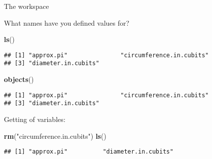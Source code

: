 \documentclass[8pt,ignorenonframetext,]{beamer}
\newenvironment{Shaded}{\begin{snugshade}}{\end{snugshade}}
\newcommand{\KeywordTok}[1]{\textcolor[rgb]{0.13,0.29,0.53}{\textbf{#1}}}
\newcommand{\StringTok}[1]{\textcolor[rgb]{0.31,0.60,0.02}{#1}}
\newcommand{\NormalTok}[1]{#1}
\begin{document}
\begin{frame}[fragile]{The workspace}

What names have you defined values for?

\begin{Shaded}
\begin{Highlighting}[]
\KeywordTok{ls}\NormalTok{()}
\end{Highlighting}
\end{Shaded}

\begin{verbatim}
## [1] "approx.pi"               "circumference.in.cubits"
## [3] "diameter.in.cubits"
\end{verbatim}

\begin{Shaded}
\begin{Highlighting}[]
\KeywordTok{objects}\NormalTok{()}
\end{Highlighting}
\end{Shaded}

\begin{verbatim}
## [1] "approx.pi"               "circumference.in.cubits"
## [3] "diameter.in.cubits"
\end{verbatim}

Getting of variables:

\begin{Shaded}
\begin{Highlighting}[]
\KeywordTok{rm}\NormalTok{(}\StringTok{"circumference.in.cubits"}\NormalTok{)}
\KeywordTok{ls}\NormalTok{()}
\end{Highlighting}
\end{Shaded}

\begin{verbatim}
## [1] "approx.pi"          "diameter.in.cubits"
\end{verbatim}

\end{frame}
\end{document}
